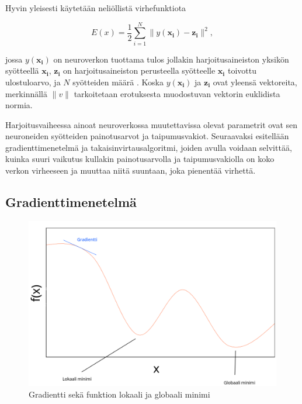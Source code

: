 \documentclass[finnish]{tktltiki2}
\theoremstyle{definition}
\theoremstyle{remark}
\begin{document}
   Hyvin yleisesti käytetään neliöllistä virhefunktiota

  \begin{equation}
    E(x) = \frac{1}{2} \sum_{i=1}^{N} \| y(\mathbf{x_i}) - \mathbf{z_i} \|^2,
    \label{eq:error-function}
  \end{equation}

  jossa $y(\mathbf{x_i})$ on neuroverkon tuottama tulos jollakin harjoitusaineiston yksikön syötteellä $\mathbf{x_i}$, $\mathbf{z_i}$ on harjoitusaineiston perusteella syötteelle $\mathbf{x_i}$ toivottu ulostuloarvo, ja $N$ syötteiden määrä \cite{Goodfellow-et-al-2016}. Koska $y(\mathbf{x_i})$ ja $\mathbf{z_i}$ ovat yleensä vektoreita, merkinnällä $\|v\|$ tarkoitetaan erotuksesta muodostuvan vektorin euklidista normia.

  Harjoitusvaiheessa ainoat neuroverkossa muutettavissa olevat parametrit ovat sen neuroneiden syötteiden painotusarvot ja taipumusvakiot. Seuraavaksi esitellään gradienttimenetelmä ja takaisinvirtausalgoritmi, joiden avulla voidaan selvittää, kuinka suuri vaikutus kullakin painotusarvolla ja taipumusvakiolla on koko verkon virheeseen ja muuttaa niitä suuntaan, joka pienentää virhettä.



  \subsection{Gradienttimenetelmä}
    \label{chap:backprop}

    \begin{figure}[h]
      \centering
      \includegraphics[scale=0.4]{gradient-descent}
      \caption{Gradientti sekä funktion lokaali ja globaali minimi}
      \label{pic:composition}
    \end{figure}
\end{document}
